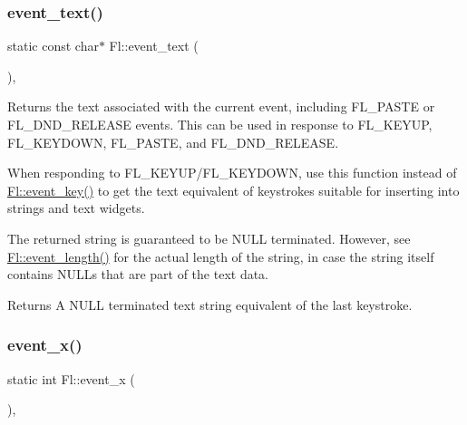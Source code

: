 \subsubsection{\texorpdfstring{event\+\_\+text()}{event\_text()}}
{\footnotesize\ttfamily static const char$\ast$ Fl\+::event\+\_\+text (\begin{DoxyParamCaption}{ }\end{DoxyParamCaption})\hspace{0.3cm}{\ttfamily [inline]}, {\ttfamily [static]}}

Returns the text associated with the current event, including F\+L\+\_\+\+P\+A\+S\+TE or F\+L\+\_\+\+D\+N\+D\+\_\+\+R\+E\+L\+E\+A\+SE events. This can be used in response to F\+L\+\_\+\+K\+E\+Y\+UP, F\+L\+\_\+\+K\+E\+Y\+D\+O\+WN, F\+L\+\_\+\+P\+A\+S\+TE, and F\+L\+\_\+\+D\+N\+D\+\_\+\+R\+E\+L\+E\+A\+SE.

When responding to F\+L\+\_\+\+K\+E\+Y\+U\+P/\+F\+L\+\_\+\+K\+E\+Y\+D\+O\+WN, use this function instead of \hyperlink{group__fl__events_ga1ac131e3cd5ca674cc022b1f77233449}{Fl\+::event\+\_\+key()} to get the text equivalent of keystrokes suitable for inserting into strings and text widgets.

The returned string is guaranteed to be N\+U\+LL terminated. However, see \hyperlink{group__fl__events_ga38f2de89fbdf59ad2cd4dca93f472911}{Fl\+::event\+\_\+length()} for the actual length of the string, in case the string itself contains N\+U\+L\+Ls that are part of the text data.

\begin{DoxyReturn}{Returns}
A N\+U\+LL terminated text string equivalent of the last keystroke. 
\end{DoxyReturn}
\mbox{\label{group__fl__events_ga91585fcbaa1e79f7452fd2d16a82136e}} 
\subsubsection{\texorpdfstring{event\+\_\+x()}{event\_x()}}
{\footnotesize\ttfamily static int Fl\+::event\+\_\+x (\begin{DoxyParamCaption}{ }\end{DoxyParamCaption})\hspace{0.3cm}{\ttfamily [inline]}, {\ttfamily [static]}}

